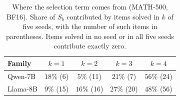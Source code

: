 \begin{table}[t]
\centering
\caption{Where the selection term comes from (MATH-500, BF16). Share of $S_b$ contributed by items solved in $k$ of five seeds, with the number of such items in parentheses. Items solved in no seed or in all five seeds contribute exactly zero.}
\label{tab:share-k}
\small
\begin{tabular}{lcccc}
\toprule
\textbf{Family} & $k=1$ & $k=2$ & $k=3$ & $k=4$ \\
\midrule
Qwen-7B & $18\%$ (6) & $5\%$ (11) & $21\%$ (7) & $56\%$ (24) \\
Llama-8B & $9\%$ (15) & $16\%$ (16) & $27\%$ (20) & $48\%$ (56) \\
\bottomrule
\end{tabular}
\end{table}
